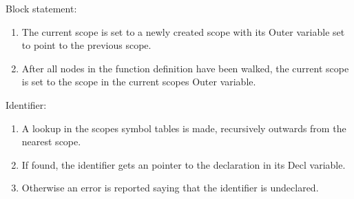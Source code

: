 Block statement:
\begin{enumerate}
\item The current scope is set to a newly created scope with its Outer variable set to point to the previous scope.

\item After all nodes in the function definition have been walked, the current scope is set to the scope in the current scopes Outer variable.
\end{enumerate}

Identifier:
\begin{enumerate}
\item A lookup in the scopes symbol tables is made, recursively outwards from the nearest scope.

\item If found, the identifier gets an pointer to the declaration in its Decl variable.

\item Otherwise an error is reported saying that the identifier is undeclared.
\end{enumerate}

